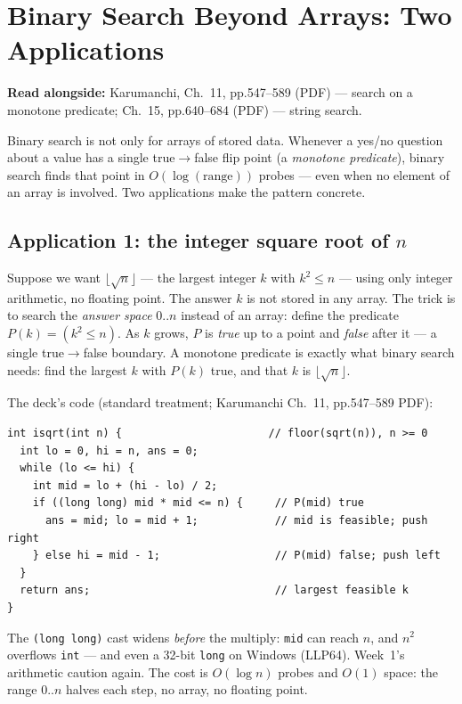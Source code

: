 \documentclass[11pt]{article}
\begin{document}
\section{Binary Search Beyond Arrays: Two Applications}

\textbf{Read alongside:} Karumanchi, Ch.~11, pp.547--589 (PDF) --- search on a monotone predicate; Ch.~15, pp.640--684 (PDF) --- string search.

Binary search is not only for arrays of stored data. Whenever a yes/no question about a value has a single true$\to$false flip point (a \emph{monotone predicate}), binary search finds that point in $O(\log(\text{range}))$ probes --- even when no element of an array is involved. Two applications make the pattern concrete.

\subsection{Application 1: the integer square root of $n$}

Suppose we want $\lfloor \sqrt{n} \rfloor$ --- the largest integer $k$ with $k^2 \le n$ --- using only integer arithmetic, no floating point. The answer $k$ is not stored in any array. The trick is to search the \emph{answer space} $0..n$ instead of an array: define the predicate $P(k) = (k^2 \le n)$. As $k$ grows, $P$ is \emph{true} up to a point and \emph{false} after it --- a single true$\to$false boundary. A monotone predicate is exactly what binary search needs: find the largest $k$ with $P(k)$ true, and that $k$ is $\lfloor \sqrt{n} \rfloor$.

The deck's code (standard treatment; Karumanchi Ch.~11, pp.547--589 PDF):

{\footnotesize
\begin{verbatim}
int isqrt(int n) {                       // floor(sqrt(n)), n >= 0
  int lo = 0, hi = n, ans = 0;
  while (lo <= hi) {
    int mid = lo + (hi - lo) / 2;
    if ((long long) mid * mid <= n) {     // P(mid) true
      ans = mid; lo = mid + 1;            // mid is feasible; push right
    } else hi = mid - 1;                  // P(mid) false; push left
  }
  return ans;                             // largest feasible k
}
\end{verbatim}
}

The \texttt{(long long)} cast widens \emph{before} the multiply: \texttt{mid} can reach $n$, and $n^2$ overflows \texttt{int} --- and even a 32-bit \texttt{long} on Windows (LLP64). Week~1's arithmetic caution again. The cost is $O(\log n)$ probes and $O(1)$ space: the range $0..n$ halves each step, no array, no floating point.
\end{document}

